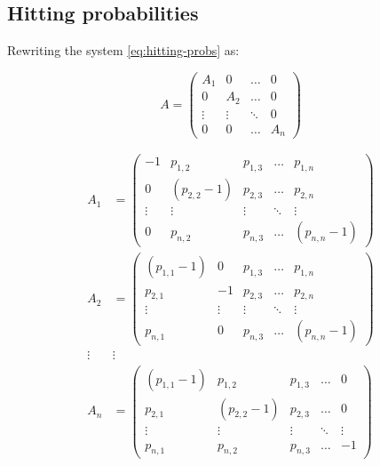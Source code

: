 \documentclass[
  nojss]{jss}
\begin{document}
\hypertarget{hitting-probabilities}{%
\subsection{Hitting probabilities}\label{hitting-probabilities}}

Rewriting the system \eqref{eq:hitting-probs} as:

\begin{equation*}
A = \left(\begin{array}{c|c|c|c}
  A_1 & 0 & \ldots & 0 \\
\hline
  0 & A_2 & \ldots & 0 \\
\hline
  \vdots & \vdots & \ddots & 0 \\
\hline
  0 & 0 & \ldots & A_n
\end{array}\right)
\end{equation*}

\begin{eqnarray*}
A_1 &= 
\left(\begin{matrix}
  -1     & p_{1,2}       & p_{1,3}   & \ldots & p_{1,n} \\
  0      & (p_{2,2} - 1) & p_{2,3}   & \ldots & p_{2,n} \\
  \vdots & \vdots        & \vdots    & \ddots & \vdots  \\
  0      & p_{n, 2}      & p_{n,3}   & \ldots & (p_{n,n} - 1)
  \end{matrix}\right)\\
A_2 &= \left(\begin{matrix}
  (p_{1,1} - 1) & 0      & p_{1,3}   & \ldots & p_{1,n} \\
  p_{2,1}       & -1     & p_{2,3}   & \ldots & p_{2,n} \\
  \vdots        & \vdots & \vdots    & \ddots & \vdots  \\
  p_{n,1}       & 0      & p_{n,3}   & \ldots & (p_{n,n} - 1)
  \end{matrix}\right)\\
\vdots & \vdots\\
A_n &= \left(\begin{matrix}
  (p_{1,1} - 1) & p_{1,2}      & p_{1,3}   & \ldots & 0 \\
  p_{2,1}       & (p_{2,2} -1) & p_{2,3}   & \ldots & 0 \\
  \vdots        & \vdots       & \vdots    & \ddots & \vdots  \\
  p_{n,1}       & p_{n,2}      & p_{n,3}   & \ldots & -1
  \end{matrix}\right)\\
\end{eqnarray*}
\end{document}
